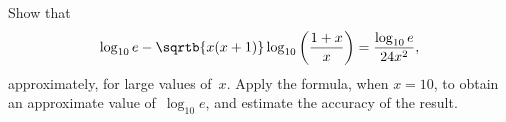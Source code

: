 Show that
\[
\log_{10} e - \sqrtb{x(x + 1)} \log_{10}\left(\frac{1 + x}{x}\right)
  = \frac{\log_{10} e}{24x^{2}},
\]
approximately, for large values of~$x$. Apply the formula, when $x = 10$, to
obtain an approximate value of~$\log_{10} e$, and estimate the accuracy of the result.


